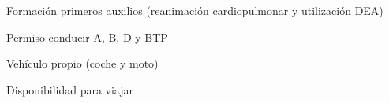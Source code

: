 
\begin{cvparagraph}
    Formación primeros auxilios (reanimación cardiopulmonar y utilización DEA)
\end{cvparagraph}

\begin{cvparagraph}
    Permiso conducir A, B, D y BTP
\end{cvparagraph}

\begin{cvparagraph}
    Vehículo propio (coche y moto)
\end{cvparagraph}

\begin{cvparagraph}
    Disponibilidad para viajar
\end{cvparagraph}
